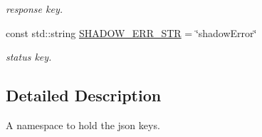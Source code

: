 \begin{DoxyCompactItemize}
\begin{DoxyCompactList}\small\item\em response key. \end{DoxyCompactList}\item 
const std\+::string \hyperlink{namespacevalStrings_a47dde5df832e325fc7fc27c31ca40139}{S\+H\+A\+D\+O\+W\+\_\+\+E\+R\+R\+\_\+\+S\+TR} = \char`\"{}shadow\+Error\char`\"{}\hypertarget{namespacevalStrings_a47dde5df832e325fc7fc27c31ca40139}{}\label{namespacevalStrings_a47dde5df832e325fc7fc27c31ca40139}

\begin{DoxyCompactList}\small\item\em status key. \end{DoxyCompactList}\end{DoxyCompactItemize}


\subsection{Detailed Description}
A namespace to hold the json keys. 